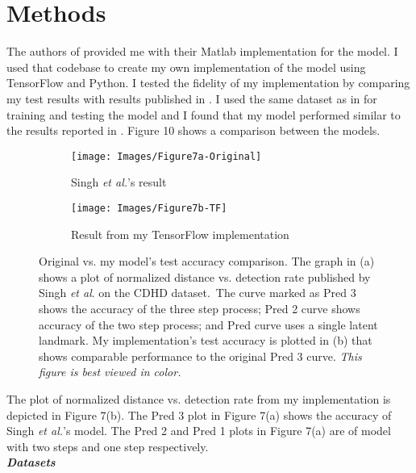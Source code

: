 \documentclass [11pt,letterpaper ,openany ]{report}
\begin{document}
    \chapter{Methods}
    \doublespacing

    The authors of \cite{Singh_2016_CVPR} provided me with their Matlab implementation for the model. I used that codebase to create my own implementation of the model using TensorFlow and Python. I tested the fidelity of my implementation by comparing my test results with results published in \cite{Singh_2016_CVPR}. I used the same dataset as in \cite{Singh_2016_CVPR} for training and testing the model and I found that my model performed similar to the results reported in \cite{Singh_2016_CVPR}. Figure 10 shows a comparison between the models.

    \begin{figure}[h!]
    \centering
        \begin{subfigure}[b]{0.45\linewidth}
            \texttt{[image: Images/Figure7a-Original]}
            \caption{Singh \textit{et al.}'s result \cite{Singh_2016_CVPR}}
        \end{subfigure}
        \begin{subfigure}[b]{0.45\linewidth}
            \texttt{[image: Images/Figure7b-TF]}
            \caption{Result from my TensorFlow implementation}
        \end{subfigure}
        \caption{Original vs. my model's test accuracy comparison. The graph in (a) shows a plot of normalized distance vs. detection rate published by Singh \textit{et al}. on the CDHD dataset.\ The curve marked as Pred 3 shows the accuracy of the three step process; Pred 2 curve shows accuracy of the two step process; and Pred curve uses a single latent landmark. My implementation's test accuracy is plotted in (b) that shows comparable performance to the original Pred 3 curve. \textit{This figure is best viewed in color.}}
        \label{fig:compare.}
    \end{figure}

    The plot of normalized distance vs. detection rate from my implementation is depicted in Figure 7(b). The Pred 3 plot in Figure 7(a) shows the accuracy of Singh \textit{et al.}'s model. The Pred 2 and Pred 1 plots in Figure 7(a) are of model with two steps and one step respectively.\\

    \noindent
    \textbf{\textit{Datasets}}
\end{document}
